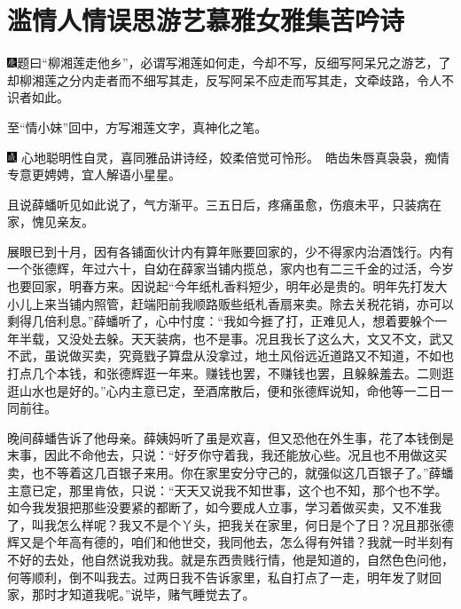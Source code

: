 

\chapter{滥情人情误思游艺\hspace{.5em}慕雅女雅集苦吟诗}
{\includegraphics[width=3mm]{../Images/00004}题曰``柳湘莲走他乡''，必谓写湘莲如何走，今却不写，反细写阿呆兄之游艺，了却柳湘莲之分内走者而不细写其走，反写阿呆不应走而写其走，文牵歧路，令人不识者如此。}

{至``情小妹''回中，方写湘莲文字，真神化之笔。}

{\includegraphics[width=3mm]{../Images/00005}  \kaishu 心地聪明性自灵，喜同雅品讲诗经，姣柔倍觉可怜形。　皓齿朱唇真袅袅，痴情专意更娉娉，宜人解语小星星。}

且说薛蟠听见如此说了，气方渐平。三五日后，疼痛虽愈，伤痕未平，只装病在家，愧见亲友。

展眼已到十月，因有各铺面伙计内有算年账要回家的，少不得家内治酒饯行。内有一个张德辉，年过六十，自幼在薛家当铺内揽总，家内也有二三千金的过活，今岁也要回家，明春方来。因说起``今年纸札香料短少，明年必是贵的。明年先打发大小儿上来当铺内照管，赶端阳前我顺路贩些纸札香扇来卖。除去关税花销，亦可以剩得几倍利息。''薛蟠听了，心中忖度：``我如今捱了打，正难见人，想着要躲个一年半载，又没处去躲。天天装病，也不是事。况且我长了这么大，文又不文，武又不武，虽说做买卖，究竟戥子算盘从没拿过，地土风俗远近道路又不知道，不如也打点几个本钱，和张德辉逛一年来。赚钱也罢，不赚钱也罢，且躲躲羞去。二则逛逛山水也是好的。''心内主意已定，至酒席散后，便和张德辉说知，命他等一二日一同前往。

晚间薛蟠告诉了他母亲。薛姨妈听了虽是欢喜，但又恐他在外生事，花了本钱倒是末事，因此不命他去，只说：``好歹你守着我，我还能放心些。况且也不用做这买卖，也不等着这几百银子来用。你在家里安分守己的，就强似这几百银子了。''薛蟠主意已定，那里肯依，只说：``天天又说我不知世事，这个也不知，那个也不学。如今我发狠把那些没要紧的都断了，如今要成人立事，学习着做买卖，又不准我了，叫我怎么样呢？我又不是个丫头，把我关在家里，何日是个了日？况且那张德辉又是个年高有德的，咱们和他世交，我同他去，怎么得有舛错？我就一时半刻有不好的去处，他自然说我劝我。就是东西贵贱行情，他是知道的，自然色色问他，何等顺利，倒不叫我去。过两日我不告诉家里，私自打点了一走，明年发了财回家，那时才知道我呢。''说毕，赌气睡觉去了。


